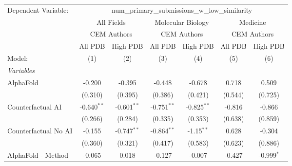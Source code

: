 \begingroup
\centering
\begin{tabular}{lcccccc}
   \tabularnewline \midrule \midrule
   Dependent Variable: & \multicolumn{6}{c}{num\_primary\_submissions\_w\_low\_similarity}\\
 & \multicolumn{2}{c}{All Fields} & \multicolumn{2}{c}{Molecular Biology} & \multicolumn{2}{c}{Medicine} \\
\cmidrule(lr){2-3} \cmidrule(lr){4-5} \cmidrule(lr){6-7}
 & \multicolumn{2}{c}{CEM Authors} & \multicolumn{2}{c}{CEM Authors} & \multicolumn{2}{c}{CEM Authors} \\
\cmidrule(lr){2-3} \cmidrule(lr){4-5} \cmidrule(lr){6-7}
 & \multicolumn{1}{c}{All PDB} & \multicolumn{1}{c}{High PDB} & \multicolumn{1}{c}{All PDB} & \multicolumn{1}{c}{High PDB} & \multicolumn{1}{c}{All PDB} & \multicolumn{1}{c}{High PDB} \\
\cmidrule(lr){2-2} \cmidrule(lr){3-3} \cmidrule(lr){4-4} \cmidrule(lr){5-5} \cmidrule(lr){6-6} \cmidrule(lr){7-7}
   Model:                                                     & (1)           & (2)           & (3)           & (4)           & (5)           & (6)\\  
   \midrule
   \emph{Variables}\\
   AlphaFold                                                  & -0.200        & -0.395        & -0.448        & -0.678        & 0.718         & 0.509\\   
                                                              & (0.310)       & (0.395)       & (0.386)       & (0.421)       & (0.544)       & (0.725)\\   
   Counterfactual AI                                          & -0.640$^{**}$ & -0.601$^{**}$ & -0.751$^{**}$ & -0.825$^{**}$ & -0.816        & -0.866\\   
                                                              & (0.266)       & (0.284)       & (0.335)       & (0.353)       & (0.638)       & (0.859)\\   
   Counterfactual No AI                                       & -0.155        & -0.747$^{**}$ & -0.864$^{**}$ & -1.15$^{**}$  & 0.628         & -0.304\\   
                                                              & (0.360)       & (0.321)       & (0.417)       & (0.583)       & (0.623)       & (0.886)\\   
   AlphaFold - Method                                         & -0.065        & 0.018         & -0.127        & -0.007        & -0.427        & -0.999$^{*}$\\   

\end{tabular}
